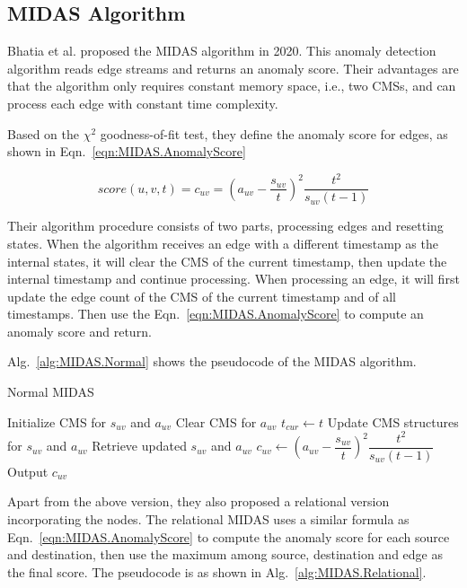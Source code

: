 \documentclass[5p]{elsarticle}
\begin{document}
	\subsection{MIDAS Algorithm}

	Bhatia et al. proposed the MIDAS algorithm in 2020. This anomaly detection algorithm reads edge streams and returns an anomaly score. Their advantages are that the algorithm only requires constant memory space, i.e., two CMSs, and can process each edge with constant time complexity.

	Based on the $\chi^2$ goodness-of-fit test, they define the anomaly score for edges, as shown in Eqn.~\ref{eqn:MIDAS.AnomalyScore}

	\begin{equation}
		\label{eqn:MIDAS.AnomalyScore}
		score(u,v,t)=c_{uv}=\left(a_{uv}-\frac{s_{uv}}{t}\right)^2\frac{t^2}{s_{uv}(t-1)}
	\end{equation}

	Their algorithm procedure consists of two parts, processing edges and resetting states. When the algorithm receives an edge with a different timestamp as the internal states, it will clear the CMS of the current timestamp, then update the internal timestamp and continue processing. When processing an edge, it will first update the edge count of the CMS of the current timestamp and of all timestamps. Then use the Eqn.~\ref{eqn:MIDAS.AnomalyScore} to compute an anomaly score and return.

	Alg.~\ref{alg:MIDAS.Normal} shows the pseudocode of the MIDAS algorithm.

	\begin{algorithm}[!htb]
		\caption{Normal MIDAS}
		\label{alg:MIDAS.Normal}
		\begin{algorithmic}[1]
			\State Initialize CMS for $s_{uv}$ and $a_{uv}$
			\State Clear CMS for $a_{uv}$
			\State $t_{cur}\gets t$
			\EndIf
			\State Update CMS structures for $s_{uv}$ and $a_{uv}$
			\State Retrieve updated $s_{uv}$ and $a_{uv}$
			\State $c_{uv}\gets\left(a_{uv}-\dfrac{s_{uv}}{t}\right)^2\dfrac{t^2}{s_{uv}(t-1)}$
			\State Output $c_{uv}$
			\EndWhile
		\end{algorithmic}
	\end{algorithm}

	Apart from the above version, they also proposed a relational version incorporating the nodes. The relational MIDAS uses a similar formula as Eqn.~\ref{eqn:MIDAS.AnomalyScore} to compute the anomaly score for each source and destination, then use the maximum among source, destination and edge as the final score. The pseudocode is as shown in Alg.~\ref{alg:MIDAS.Relational}.
\end{document}
